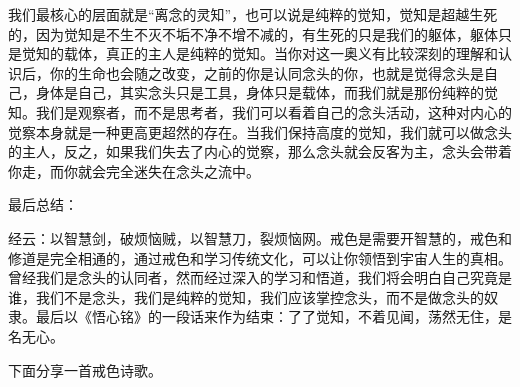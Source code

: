 我们最核心的层面就是“离念的灵知”，也可以说是纯粹的觉知，觉知是超越生死的，因为觉知是不生不灭不垢不净不增不减的，有生死的只是我们的躯体，躯体只是觉知的载体，真正的主人是纯粹的觉知。当你对这一奥义有比较深刻的理解和认识后，你的生命也会随之改变，之前的你是认同念头的你，也就是觉得念头是自己，身体是自己，其实念头只是工具，身体只是载体，而我们就是那份纯粹的觉知。我们是观察者，而不是思考者，我们可以看着自己的念头活动，这种对内心的觉察本身就是一种更高更超然的存在。当我们保持高度的觉知，我们就可以做念头的主人，反之，如果我们失去了内心的觉察，那么念头就会反客为主，念头会带着你走，而你就会完全迷失在念头之流中。

最后总结：

经云：以智慧剑，破烦恼贼，以智慧刀，裂烦恼网。戒色是需要开智慧的，戒色和修道是完全相通的，通过戒色和学习传统文化，可以让你领悟到宇宙人生的真相。曾经我们是念头的认同者，然而经过深入的学习和悟道，我们将会明白自己究竟是谁，我们不是念头，我们是纯粹的觉知，我们应该掌控念头，而不是做念头的奴隶。最后以《悟心铭》的一段话来作为结束：了了觉知，不着见闻，荡然无住，是名无心。

下面分享一首戒色诗歌。

